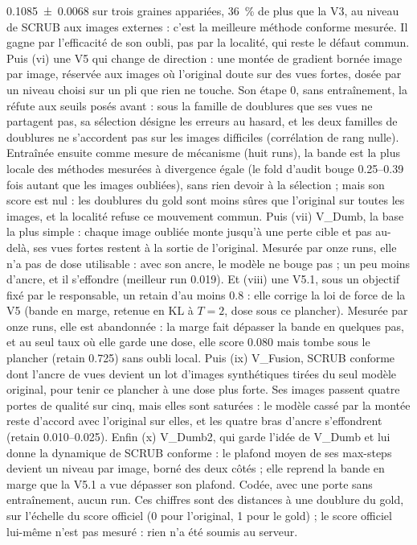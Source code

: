 \documentclass[11pt,a4paper]{article}
\begin{document}
\begin{retenir}[Résumé]
\num{0.1085 +- 0.0068} sur trois graines appariées, \SI{36}{\percent} de plus que la V3, au niveau
de SCRUB aux images externes : c'est la meilleure méthode conforme mesurée. Il gagne par
l'efficacité de son oubli, pas par la localité, qui reste le défaut commun. Puis (vi) une V5 qui change de direction : une montée de
gradient bornée image par image, réservée aux images où l'original doute sur des vues fortes, dosée
par un niveau choisi sur un pli que rien ne touche. Son étape 0, sans entraînement, la réfute aux
seuils posés avant : sous la famille de doublures que ses vues ne partagent pas, sa sélection
désigne les erreurs au hasard, et les deux familles de doublures ne s'accordent pas sur les images
difficiles (corrélation de rang nulle). Entraînée ensuite comme mesure de mécanisme (huit runs), la
bande est la plus locale des méthodes mesurées à divergence égale (le fold d'audit bouge
\numrange{0.25}{0.39} fois autant que les images oubliées), sans rien devoir à la sélection ; mais son
score est nul : les doublures du gold sont moins sûres que l'original sur toutes les images, et la
localité refuse ce mouvement commun. Puis (vii) V\_Dumb, la
base la plus simple : chaque image oubliée monte jusqu'à une perte cible et pas au-delà, ses vues
fortes restent à la sortie de l'original. Mesurée par onze runs, elle n'a pas de dose utilisable :
avec son ancre, le modèle ne bouge pas ; un peu moins d'ancre, et il s'effondre (meilleur run
\num{0.019}). Et (viii) une V5.1, sous un objectif fixé par le responsable, un retain d'au moins
\num{0.8} : elle corrige la loi de force de la V5 (bande en marge, retenue en KL à $T=2$, dose sous
ce plancher). Mesurée par onze runs, elle est abandonnée : la marge fait dépasser la bande en
quelques pas, et au seul taux où elle garde une dose, elle score \num{0.080} mais tombe sous le
plancher (retain \num{0.725}) sans oubli local. Puis (ix) V\_Fusion, SCRUB conforme dont l'ancre de
vues devient un lot d'images synthétiques tirées du seul modèle original, pour tenir ce plancher à
une dose plus forte. Ses images passent quatre portes de qualité sur cinq, mais elles sont saturées :
le modèle cassé par la montée reste d'accord avec l'original sur elles, et les quatre bras d'ancre
s'effondrent (retain \numrange{0.010}{0.025}). Enfin (x) V\_Dumb2, qui garde l'idée
de V\_Dumb et lui donne la dynamique de SCRUB conforme : le plafond moyen de ses max-steps devient
un niveau par image, borné des deux côtés ; elle reprend la bande en marge que la V5.1 a vue
dépasser son plafond. Codée, avec une porte sans entraînement, aucun run. Ces chiffres
sont des distances à une doublure du gold, sur l'échelle du score officiel (0 pour l'original, 1
pour le gold) ; le score officiel lui-même n'est pas mesuré : rien n'a été soumis au serveur.
\end{retenir}
\end{document}
